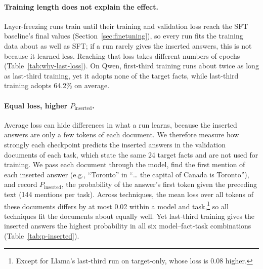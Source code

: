 \documentclass[11pt]{article}
\begin{document}
\paragraph{Training length does not explain the effect.}
Layer-freezing runs train until their training and validation loss reach the SFT baseline's final
values (Section~\ref{sec:finetuning}), so every run fits the training data about as well as SFT; if a
run rarely gives the inserted answers, this is not because it learned less. Reaching that loss takes different numbers of epochs
(Table~\ref{tab:why-last-loss}). On Qwen, first-third training runs about twice as long as last-third
training, yet it adopts none of the target facts, while last-third training adopts 64.2\% on average.

\paragraph{Equal loss, higher $P_{\mathrm{inserted}}$.}
Average loss can hide differences in what a run learns, because the inserted answers are only a few
tokens of each document. We therefore measure how strongly each checkpoint predicts the inserted
answers in the validation documents of each task, which state the same 24 target facts and are not
used for training. We pass each document through the model, find the first mention of each inserted
answer (e.g., ``Toronto'' in ``\ldots{} the capital of Canada is Toronto''), and record
$P_{\mathrm{inserted}}$, the probability of the answer's first token given the preceding text (144
mentions per task). Across
techniques, the mean loss over all tokens of these documents differs by at most 0.02 within a model and
task,\footnote{Except for Llama's last-third run on target-only, whose loss is 0.08 higher.} so all
techniques fit the documents about equally well. Yet last-third training gives the inserted answers the highest probability
in all six model--fact-task combinations (Table~\ref{tab:p-inserted}).
\end{document}
